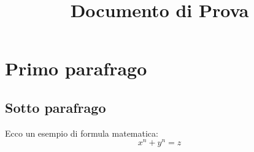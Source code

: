 \documentclass[12pt,a4paper]{article}
\title{Documento di Prova}
\author{}
\date{}
\begin{document}
\maketitle
\tableofcontents
\newpage

\section{Primo parafrago}
\lipsum
\subsection{Sotto parafrago}

Ecco un esempio di formula matematica:
\[x^n + y^n = z\]
\end{document}
